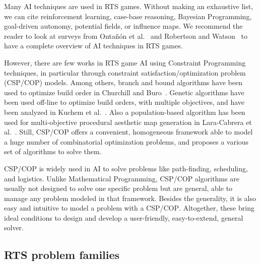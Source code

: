 \documentclass[journal]{IEEEtran}
\newcommand{\csp}{\textsc{CSP}\xspace}
\newcommand{\cop}{\textsc{COP}\xspace}
\begin{document}
Many AI techniques are used in RTS games. Without making an exhaustive
list,  we  can  cite   reinforcement  learning,  case-base  reasoning,
Bayesian Programming, goal-driven autonomy,  potential fields, or influence maps. We
recommend  the  reader to  look  at  surveys from  Onta{\~n}{\'o}n  et
al.~\cite{OntanonSURCM13} and Robertson and Watson~\cite{RobertsonW14}
to have a complete overview of AI techniques in RTS games.

However,  there  are  few  works  in  RTS  game  AI  using  Constraint
Programming    techniques,    in   particular    through    constraint
satisfaction/optimization problem  (\csp/\cop) models.   Among others,
branch and bound algorithms have been  used to optimize build order in
Churchill and Buro~\cite{ChurchillB11}.   Genetic algorithms have been
used off-line to  optimize build orders, with  multiple objectives, and
have  been   analyzed  in   Kuchem  et  al.~\cite{KuchemPR13}.   Also  a
population-based   algorithm  has   been   used  for   multi-objective
procedural    aesthetic   map    generation    in   Lara-Cabrera    et
al.~\cite{LaraCF14}.    Still,   \csp/\cop    offers   a   convenient,
homogeneous framework able to model a huge number of combinatorial optimization problems,  and proposes  a various  set of  algorithms to
solve them.

\csp/\cop is widely used in  AI to solve problems
like  path-finding, scheduling,  and  logistics.  Unlike  Mathematical
Programming, \csp/\cop  algorithms are  usually not designed  to solve
one  specific problem  but are  general, able  to manage  any problem
modeled in that framework. Besides the generality, it is also easy and
intuitive  to model  a problem  with a  \csp/\cop.  Altogether,  these
bring  ideal  conditions  to   design  and  develop  a  user-friendly,
easy-to-extend, general solver.


\subsection{RTS problem families}
\end{document}
